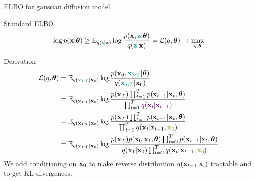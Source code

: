 \begin{frame}{ELBO for gaussian diffusion model}
	\begin{block}{Standard ELBO}
		\vspace{-0.4cm}
		\[
			\log p(\mathbf{x} | \boldsymbol{\theta}) \geq \mathbb{E}_{q({\color{teal}\mathbf{z}} | \mathbf{x})} \log \frac{p(\mathbf{x}, {\color{teal}\mathbf{z}} | \boldsymbol{\theta})}{q({\color{teal}\mathbf{z}} | \mathbf{x})} = \mathcal{L}(q, \boldsymbol{\theta}) \rightarrow \max_{q, \boldsymbol{\theta}}
		\]
		\vspace{-0.5cm}
	\end{block}
	\begin{block}{Derivation}
		\vspace{-0.5cm}
		{\small
		\begin{align*}
			\cL(q, \btheta) &= \bbE_{q({\color{teal}\bx_{1:T}} | \bx_0)} \log \frac{p(\bx_0, {\color{teal}\bx_{1:T}} | \btheta)}{q({\color{teal}\bx_{1:T}} | \bx_0)} \\
			& = \bbE_{q(\bx_{1:T} | \bx_0)} \log \frac{p(\bx_T) \prod_{t=1}^T p(\bx_{t-1} | \bx_t, \btheta) }{\prod_{t=1}^T {\color{violet}q(\bx_t | \bx_{t-1})}}  \\ 
			& = \bbE_{q(\bx_{1:T} | \bx_0)} \log \frac{p(\bx_T) \prod_{t=1}^T p(\bx_{t-1} | \bx_t, \btheta) }{\prod_{t=1}^T q(\bx_t | \bx_{t-1}, {\color{olive}\bx_0})}  \\ 
			& = \bbE_{q(\bx_{1:T} | \bx_0)} \log \frac{p(\bx_T) p(\bx_0 | \bx_1, \btheta) \prod_{t=2}^T p(\bx_{t-1} | \bx_t, \btheta) }{q(\bx_1 | \bx_0)\prod_{t=2}^T q(\bx_t | \bx_{t-1}, {\color{olive}\bx_0})} 
		\end{align*}}
		We add conditioning on $\mathbf{x}_0$ to make reverse distribution $q(\mathbf{x}_{t - 1} | \mathbf{x}_t)$ tractable and to get KL divergences.
	\end{block}
	
\end{frame}
